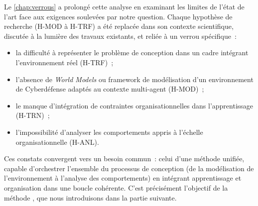 \noindent
Le \autoref{chap:verrous} a prolongé cette analyse en examinant les limites de l'état de l'art face aux exigences soulevées par notre question. Chaque hypothèse de recherche (H-MOD à H-TRF) a été replacée dans son contexte scientifique, discutée à la lumière des travaux existants, et reliée à un verrou spécifique~:
\begin{itemize}
  \item la difficulté à représenter le problème de conception dans un cadre intégrant l'environnement réel (H-TRF)~;
  \item l'absence de \textit{World Models} ou framework de modélisation d'un environnement de Cyberdéfense adaptés au contexte multi-agent (H-MOD)~;
  \item le manque d'intégration de contraintes organisationnelles dans l'apprentissage (H-TRN)~;
  \item l'impossibilité d'analyser les comportements appris à l'échelle organisationnelle (H-ANL).
\end{itemize}

\medskip

\noindent
Ces constats convergent vers un besoin commun~: celui d'une méthode unifiée, capable d'orchestrer l'ensemble du processus de conception (de la modélisation de l'environnement à l'analyse des comportements) en intégrant apprentissage et organisation dans une boucle cohérente. C'est précisément l'objectif de la méthode , que nous introduisons dans la partie suivante.
